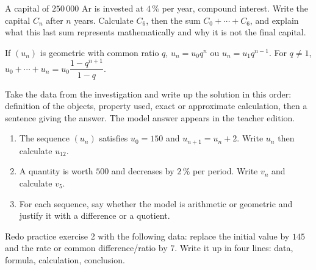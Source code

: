 \begin{activite}
A capital of $250\,000$ Ar is invested at $4\,\%$ per year, compound interest. Write the capital $C_n$ after $n$ years. Calculate $C_6$, then the sum $C_0+\cdots+C_6$, and explain what this last sum represents mathematically and why it is not the final capital.

\end{activite}

\begin{traceecrite}If $(u_n)$ is geometric with common ratio $q$, $u_n=u_0q^n$ ou $u_n=u_1q^{n-1}$. For $q\neq1$, $u_0+\cdots+u_n=u_0\dfrac{1-q^{n+1}}{1-q}$.\end{traceecrite}

\begin{exemple}
Take the data from the investigation and write up the solution in this order: definition of the objects, property used, exact or approximate calculation, then a sentence giving the answer. The model answer appears in the teacher edition.
\end{exemple}

\begin{exercice}[-- essential]
\begin{enumerate}\item The sequence $(u_n)$ satisfies $u_0=150$ and $u_{n+1}=u_n+2$. Write $u_n$ then calculate $u_{12}$.\item A quantity is worth $500$ and decreases by $2\,\%$ per period. Write $v_n$ and calculate $v_5$.\item For each sequence, say whether the model is arithmetic or geometric and justify it with a difference or a quotient.\end{enumerate}
\end{exercice}


\begin{dm}Redo practice exercise 2 with the following data: replace the initial value by $145$ and the rate or common difference/ratio by $7$. Write it up in four lines: data, formula, calculation, conclusion.\end{dm}

